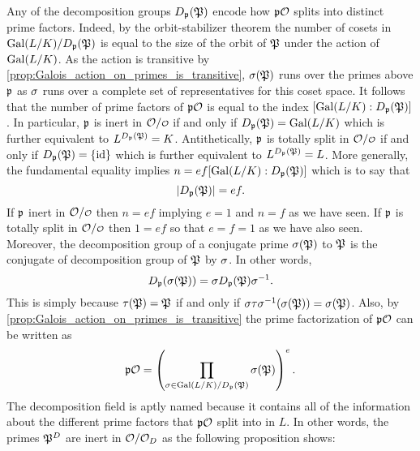     Any of the decomposition groups $D_{\mathfrak{p}}(\mathfrak{P})$ encode how $\mathfrak{p}\mathcal{O}$ splits into distinct prime factors. Indeed, by the orbit-stabilizer theorem the number of cosets in $\operatorname{\mathrm{Gal}}(L/K)/D_{\mathfrak{p}}(\mathfrak{P})$ is equal to the size of the orbit of $\mathfrak{P}$ under the action of $\operatorname{\mathrm{Gal}}(L/K)$. As the action is transitive by \cref{prop:Galois_action_on_primes_is_transitive}, $\sigma(\mathfrak{P})$ runs over the primes above $\mathfrak{p}$ as $\sigma$ runs over a complete set of representatives for this coset space. It follows that the number of prime factors of $\mathfrak{p}\mathcal{O}$ is equal to the index $[\operatorname{\mathrm{Gal}}(L/K):D_{\mathfrak{p}}(\mathfrak{P})]$. In particular, $\mathfrak{p}$ is inert in $\mc{O}/\smc{O}$ if and only if $D_{\mathfrak{p}}(\mathfrak{P}) = \operatorname{\mathrm{Gal}}(L/K)$ which is further equivalent to $L^{D_{\mathfrak{p}}(\mathfrak{P})} = K$. Antithetically, $\mathfrak{p}$ is totally split in $\mc{O}/\smc{O}$ if and only if $D_{\mathfrak{p}}(\mathfrak{P}) = \{\operatorname{\textrm{id}}\}$ which is further equivalent to $L^{D_{\mathfrak{p}}(\mathfrak{P})} = L$. More generally, the fundamental equality implies $n = ef[\operatorname{\mathrm{Gal}}(L/K):D_{\mathfrak{p}}(\mathfrak{P})]$ which is to say that
    \[
      |D_{\mathfrak{p}}(\mathfrak{P})| = ef.
    \]
    If $\mathfrak{p}$ inert in $\mc{O}/\smc{O}$ then $n = ef$ implying $e = 1$ and $n = f$ as we have seen. If $\mathfrak{p}$ is totally split in $\mc{O}/\smc{O}$ then $1 = ef$ so that $e = f = 1$ as we have also seen. Moreover, the decomposition group of a conjugate prime $\sigma(\mathfrak{P})$ to $\mathfrak{P}$ is the conjugate of decomposition group of $\mathfrak{P}$ by $\sigma$. In other words,
    \[
      D_{\mathfrak{p}}(\sigma(\mathfrak{P})) = \sigma D_{\mathfrak{p}}(\mathfrak{P})\sigma^{-1}.
    \]
    This is simply because $\tau(\mathfrak{P}) = \mathfrak{P}$ if and only if $\sigma\tau\sigma^{-1}(\sigma(\mathfrak{P})) = \sigma(\mathfrak{P})$. Also, by \cref{prop:Galois_action_on_primes_is_transitive} the prime factorization of $\mathfrak{p}\mathcal{O}$ can be written as
    \[
      \mathfrak{p}\mathcal{O} = \left(\prod_{\sigma \in \operatorname{\mathrm{Gal}}(L/K)/D_{\mathfrak{p}}(\mathfrak{P})}\sigma(\mathfrak{P})\right)^{e}.
    \]
    The decomposition field is aptly named because it contains all of the information about the different prime factors that $\mathfrak{p}\mathcal{O}$ split into in $L$. In other words, the primes $\mathfrak{P}^{D}$ are inert in $\mathcal{O}/\mathcal{O}_{D}$ as the following proposition shows:

